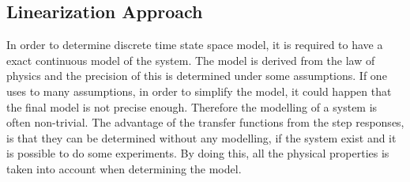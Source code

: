 \subsection{Linearization Approach}
In order to determine discrete time state space model, it is  required to have a exact continuous model of the system. The model is derived from the law of physics and the precision of this is determined under some assumptions. If one uses to many assumptions, in order to simplify the model, it could happen that the final model is not precise enough. Therefore the modelling of a system is often non-trivial. The advantage of the transfer functions from the step responses, is that they can be determined without any modelling, if the system exist and it is possible to do some experiments. By doing this, all the physical properties is taken into account when determining the model.